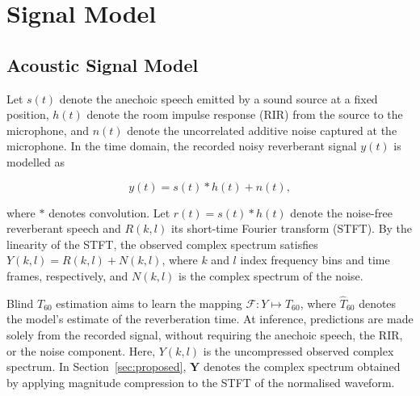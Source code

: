 \documentclass[a4paper,fleqn]{cas-sc}
\begin{document}


\section{Signal Model}
\label{sec:signal_model}



\subsection{Acoustic Signal Model}
\label{sec:acoustic_model}



Let $s(t)$ denote the anechoic speech emitted by a sound source at a fixed position, $h(t)$ denote the room impulse response (RIR) from the source to the microphone, and $n(t)$ denote the uncorrelated additive noise captured at the microphone. In the time domain, the recorded noisy reverberant signal $y(t)$ is modelled as



\begin{equation}
y(t) = s(t)\ast h(t) + n(t), \tag{1}\label{eq:signal}
\end{equation}



\noindent where $\ast$ denotes convolution. Let $r(t)=s(t)\ast h(t)$ denote the noise-free reverberant speech and $R(k,l)$ its short-time Fourier transform (STFT). By the linearity of the STFT, the observed complex spectrum satisfies $Y(k,l)=R(k,l)+N(k,l)$, where $k$ and $l$ index frequency bins and time frames, respectively, and $N(k,l)$ is the complex spectrum of the noise.



Blind $T_{60}$ estimation aims to learn the mapping $\mathcal{F}:Y \mapsto \hat{T}_{60}$, where $\hat{T}_{60}$ denotes the model's estimate of the reverberation time. At inference, predictions are made solely from the recorded signal, without requiring the anechoic speech, the RIR, or the noise component. Here, $Y(k,l)$ is the uncompressed observed complex spectrum. In Section~\ref{sec:proposed}, $\mathbf Y$ denotes the complex spectrum obtained by applying magnitude compression to the STFT of the normalised waveform.
\end{document}
